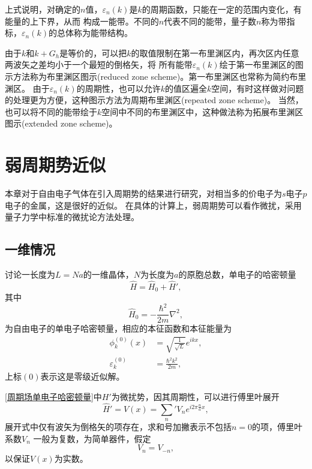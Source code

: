             上式说明，对确定的$n$值，$\varepsilon_n(k)$是$k$的周期函数，只能在一定的范围内变化，有能量的上下界，从而
            构成一能带。不同的$n$代表不同的能带，量子数$n$称为带指标，$\varepsilon_n(k)$的总体称为能带结构。

            由于$k$和$k+G_h$是等价的，可以把$k$的取值限制在第一布里渊区内，再次区内任意两波矢之差均小于一个最短的倒格矢，将
            所有能带$\varepsilon_n(k)$绘于第一布里渊区的图示方法称为布里渊区图示(reduced zone scheme)。第一布里渊区也常称为简约布里渊区。
            由于$\varepsilon_n(k)$的周期性，也可以允许$k$的值区遍全$k$空间，有时这样做对问题的处理更为方便，这种图示方法为周期布里渊区(repeated zone scheme)。
            当然，也可以将不同的能带绘于$k$空间中不同的布里渊区中，这种做法称为拓展布里渊区图示(extended zone scheme)。
    
    \section{弱周期势近似}\label{section:弱周期场近似}
        本章对于自由电子气体在引入周期势的结果进行研究，对相当多的价电子为$s$电子$p$电子的金属，这是很好的近似。
        在具体的计算上，弱周期势可以看作微扰，采用量子力学中标准的微扰论方法处理。
        
        \subsection{一维情况}\label{subsection:弱周期势近似一维情况}
            讨论一长度为$L=Na$的一维晶体，$N$为长度为$a$的原胞总数，单电子的哈密顿量
            \begin{equation}
                \hat{H}=\hat{H}_0+\hat{H}'\label{周期场单电子哈密顿量},
            \end{equation}
            其中
            \begin{equation}
                \hat{H}_0=-\frac{\hbar^2}{2m}\nabla^2,
            \end{equation}
            为自由电子的单电子哈密顿量，相应的本征函数和本征能量为
            \begin{align}
                \phi_k^{(0)}(x)&=\sqrt{\frac{1}{\sqrt{L}}}e^{ikx}\label{自由电子哈密顿量本征函数},\\
                \varepsilon_k^{(0)}&=\frac{\hbar^2k^2}{2m}\label{自由电子哈密顿量本征值},
            \end{align}
            上标$(0)$表示这是零级近似解。
            
            \autoref{周期场单电子哈密顿量}中$H'$为微扰势，因其周期性，可以进行傅里叶展开
            \begin{equation}
                \hat{H}'=V(x)=\sum_n{}'V_ne^{i2\pi\frac{n}{a}x}\label{周期微扰势的傅里叶展开},
            \end{equation}
            展开式中仅有波矢为倒格矢的项存在，求和号加撇表示不包括$n=0$的项，傅里叶系数$V_n$
            一般为复数，为简单器件，假定
            \begin{equation}
                V_n=V_{-n},
            \end{equation}
            以保证$V(x)$为实数。

